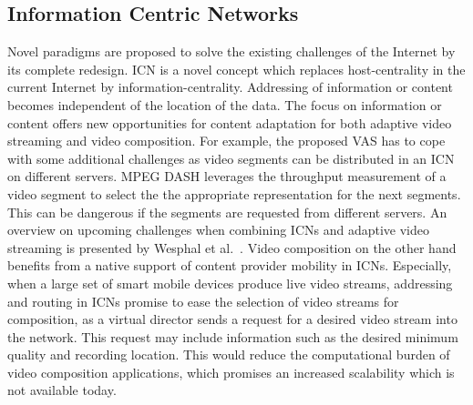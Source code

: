 \subsection{Information Centric Networks}
Novel paradigms are proposed to solve the existing challenges of the Internet by its complete redesign.
\ac{ICN} is a novel concept which replaces host-centrality in the current Internet by information-centrality.
Addressing of information or content becomes independent of the location of the data.
The focus on information or content offers new opportunities for content adaptation for both adaptive video streaming and video composition.
For example, the proposed \ac{VAS} has to cope with some additional challenges as video segments can be distributed in an \ac{ICN} on different servers.
\ac{MPEG} \ac{DASH} leverages the throughput measurement of a video segment to select the the appropriate representation for the next segments. This can be dangerous if the segments are requested from different servers.
An overview on upcoming challenges when combining \acp{ICN} and adaptive video streaming is presented by Wesphal et al.~\cite{rfc7933}.
Video composition on the other hand benefits from a native support of content provider mobility in \acp{ICN}.
Especially, when a large set of smart mobile devices produce live video streams,
addressing and routing in \acp{ICN} promise to ease the selection of video streams for composition, as a virtual director sends a request for a desired video stream into the network.
This request may include information such as the desired minimum quality and recording location.
This would reduce the computational burden of video composition applications, which promises an increased scalability which is not available today.